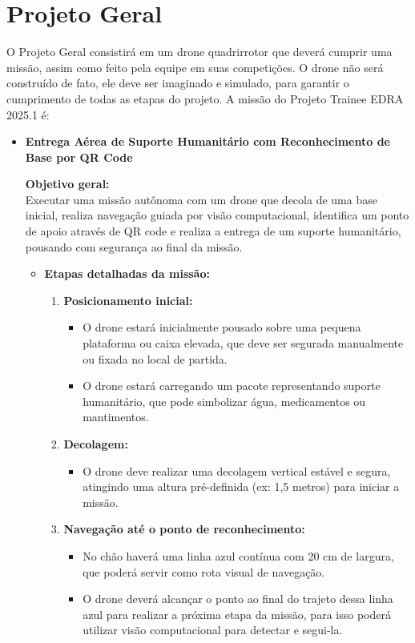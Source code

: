 \section{Projeto Geral}

O Projeto Geral consistirá em um drone quadrirrotor que deverá cumprir uma missão, assim como feito pela equipe em suas competições. O drone não será construído de fato, ele deve ser imaginado e simulado, para garantir o cumprimento de todas as etapas do projeto. A missão do Projeto Trainee EDRA 2025.1 é:

\begin{itemize}
    \item \textbf{Entrega Aérea de Suporte Humanitário com Reconhecimento de Base por QR Code}
    
    \textbf{Objetivo geral:} \\
    Executar uma missão autônoma com um drone que decola de uma base inicial, realiza navegação guiada por visão computacional, identifica um ponto de apoio através de QR code e realiza a entrega de um suporte humanitário, pousando com segurança ao final da missão.
    
    \begin{itemize}
        \item \textbf{Etapas detalhadas da missão:}
        
        \begin{enumerate}
            \item \textbf{Posicionamento inicial:}
            \begin{itemize}
                \item O drone estará inicialmente pousado sobre uma pequena plataforma ou caixa elevada, que deve ser segurada manualmente ou fixada no local de partida.
                \item O drone estará carregando um pacote representando suporte humanitário, que pode simbolizar água, medicamentos ou mantimentos.
            \end{itemize}
            
            \item \textbf{Decolagem:}
            \begin{itemize}
                \item O drone deve realizar uma decolagem vertical estável e segura, atingindo uma altura pré-definida (ex: 1,5 metros) para iniciar a missão.
            \end{itemize}
            
            \item \textbf{Navegação até o ponto de reconhecimento:}
            \begin{itemize}
                \item No chão haverá uma linha azul contínua {\color{red} com 20 cm de largura}, que poderá servir como rota visual de navegação.
                \item {\color{red}O drone deverá alcançar o ponto ao final do trajeto dessa linha azul para realizar a próxima etapa da missão, para isso poderá utilizar visão computacional para detectar e segui-la.}
            \end{itemize}
            

\end{enumerate}
\end{itemize}
\end{itemize}
